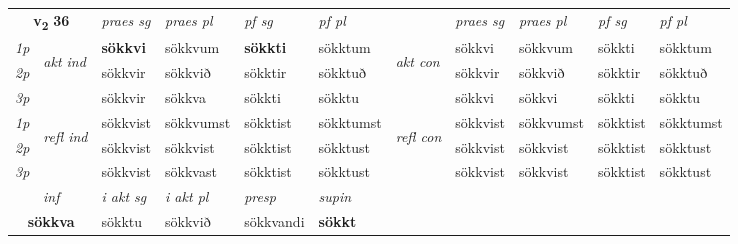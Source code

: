 \noindent
\begin{tabular}{lllllllllll} \toprule
\multicolumn{2}{c}{\textbf{v{\textsubscript{2}}} \Large{\textbf{36}}}  &  \textit{praes sg}  & \textit{praes pl}  &\textit{ pf sg} & \textit{pf pl} &  &  \textit{praes sg}  & \textit{praes pl}  & \textit{pf sg} & \textit{pf pl } \\*
	\cmidrule{3-6} \cmidrule{8-11}
 {\textit{1p}} & \multirow{3}{*}{\begin{turn}{90}\textit{akt ind}\end{turn}} & \textbf{sökkvi} & sökkvum & \textbf{sökkti} & sökktum & \multirow{3}{*}{\begin{turn}{90}\textit{akt con}\end{turn}} &sökkvi & sökkvum & sökkti & sökktum\\*
 {\textit{2p}} &  &  sökkvir  & sökkvið & sökktir & sökktuð & & sökkvir & sökkvið & sökktir & sökktuð \\*
{\textit{3p}} &  & sökkvir & sökkva & sökkti & sökktu & & sökkvi & sökkvi& sökkti & sökktu \\*
\cmidrule{3-6} \cmidrule{8-11}
 {\textit{1p}} & \multirow{3}{*}{\begin{turn}{90}\textit{refl ind}\end{turn}}  & sökkvist & sökkvumst & sökktist & sökktumst & \multirow{3}{*}{\begin{turn}{90}\textit{refl con}\end{turn}}  &sökkvist & sökkvumst & sökktist & sökktumst \\*
 {\textit{2p}} &  & sökkvist & sökkvist & sökktist & sökktust & &sökkvist & sökkvist & sökktist & sökktust \\*
 {\textit{3p}}  & & sökkvist & sökkvast & sökktist & sökktust & & sökkvist & sökkvist& sökktist & sökktust \\*
\cmidrule{3-6} \cmidrule{8-11}

   \multicolumn{2}{c}{\textit{inf}}  & \textit{i akt sg} & \textit{i akt pl}   & \textit{presp} & \textit{supin}   \\*
  \multicolumn{2}{c}{\textbf{sökkva}} & sökktu  & sökkvið   & sökkvandi &  \textbf{sökkt}   \\*
\end{tabular}

